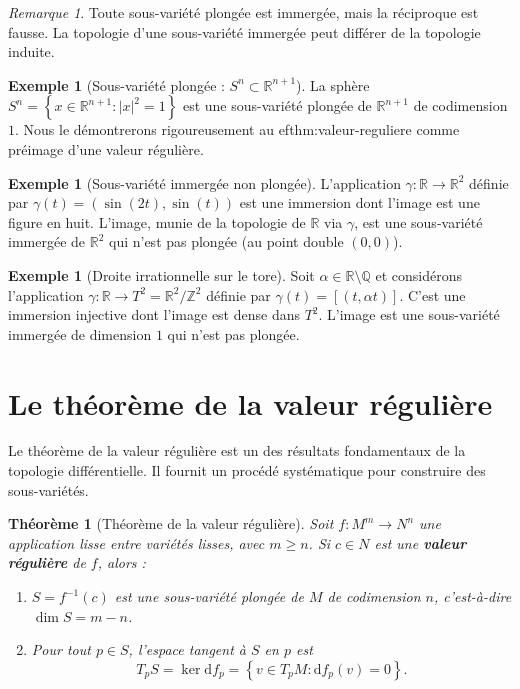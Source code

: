 \documentclass[12pt,a4paper,openany]{book}
\theoremstyle{definition}
\newtheorem{exemple}[definition]{Exemple}
\theoremstyle{plain}
\newtheorem{theoreme}[definition]{Théorème}
\theoremstyle{remark}
\newtheorem{remarque}[definition]{Remarque}
\newcommand{\Z}{\mathbb{Z}}
\newcommand{\Q}{\mathbb{Q}}
\newcommand{\R}{\mathbb{R}}
\newcommand{\dd}{\mathrm{d}}
\newcommand{\abs}[1]{\left|#1\right|}
\newcommand{\set}[1]{\left\{#1\right\}}
\begin{document}
\begin{remarque}\label{rem:plongee-vs-immergee}
Toute sous-variété plongée est immergée, mais la réciproque est fausse.
La topologie d'une sous-variété immergée peut différer de la topologie induite.
\end{remarque}

\begin{exemple}[Sous-variété plongée : $S^n \subset \R^{n+1}$]\label{ex:sphere-plongee}
La sphère $S^n = \set{x \in \R^{n+1} : \abs{x}^2 = 1}$ est une sous-variété
plongée de $\R^{n+1}$ de codimension $1$. Nous le démontrerons rigoureusement
au 
ef{thm:valeur-reguliere} comme préimage d'une valeur régulière.
\end{exemple}

\begin{exemple}[Sous-variété immergée non plongée]\label{ex:huit-immerse}
L'application $\gamma : \R \to \R^2$ définie par
$\gamma(t) = (\sin(2t), \sin(t))$ est une immersion dont l'image est une
figure en huit. L'image, munie de la topologie de $\R$ via $\gamma$, est une
sous-variété immergée de $\R^2$ qui n'est pas plongée (au point double $(0,0)$).
\end{exemple}

\begin{exemple}[Droite irrationnelle sur le tore]\label{ex:droite-irrationnelle}
Soit $\alpha \in \R \setminus \Q$ et considérons l'application
$\gamma : \R \to T^2 = \R^2/\Z^2$ définie par $\gamma(t) = [(t, \alpha t)]$.
C'est une immersion injective dont l'image est dense dans $T^2$.
L'image est une sous-variété immergée de dimension $1$ qui n'est pas plongée.
\end{exemple}

\section{Le théorème de la valeur régulière}\label{sec:valeur-reguliere}

Le théorème de la valeur régulière est un des résultats fondamentaux de la
topologie différentielle. Il fournit un procédé systématique pour construire
des sous-variétés.

\begin{theoreme}[Théorème de la valeur régulière]\label{thm:valeur-reguliere}
Soit $f : M^m \to N^n$ une application lisse entre variétés lisses, avec $m \geqslant n$.
Si $c \in N$ est une \textbf{valeur régulière} de $f$, alors :
\begin{enumerate}[label=(\roman*)]
  \item $S = f^{-1}(c)$ est une sous-variété plongée de $M$ de
    codimension $n$, c'est-à-dire $\dim S = m - n$.
  \item Pour tout $p \in S$, l'espace tangent à $S$ en $p$ est
    \[
      T_pS = \ker \dd f_p = \set{v \in T_pM : \dd f_p(v) = 0}.
    \]
\end{enumerate}
\end{theoreme}
\end{document}
